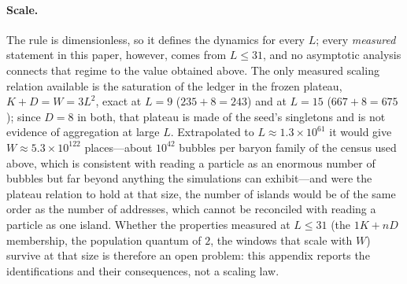\documentclass[a4paper]{article}
\begin{document}
\paragraph{Scale.}  The rule is dimensionless, so it defines the dynamics for every $L$; every \emph{measured} statement in this paper, however, comes from $L\le31$, and no asymptotic analysis connects that regime to the value obtained above.  The only measured scaling relation available is the saturation of the ledger in the frozen plateau, $K+D=W=3L^{2}$, exact at $L=9$ ($235+8=243$) and at $L=15$ ($667+8=675$); since $D=8$ in both, that plateau is made of the seed's singletons and is not evidence of aggregation at large $L$.  Extrapolated to $L\approx1.3\times10^{61}$ it would give $W\approx5.3\times10^{122}$ places---about $10^{42}$ bubbles per baryon family of the census used above, which is consistent with reading a particle as an enormous number of bubbles but far beyond anything the simulations can exhibit---and were the plateau relation to hold at that size, the number of islands would be of the same order as the number of addresses, which cannot be reconciled with reading a particle as one island.  Whether the properties measured at $L\le31$ (the $1K+nD$ membership, the population quantum of $2$, the windows that scale with $W$) survive at that size is therefore an open problem: this appendix reports the identifications and their consequences, not a scaling law.
\end{document}

